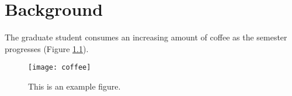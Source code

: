 \chapter{Background}

The graduate student consumes an increasing amount of coffee as the semester progresses (Figure \ref{fig:coffee}). \lipsum[2]

\begin{figure}[h]
    \centering
    \texttt{[image: coffee]}
    \caption{This is an example figure.}
    \label{fig:coffee}
\end{figure}